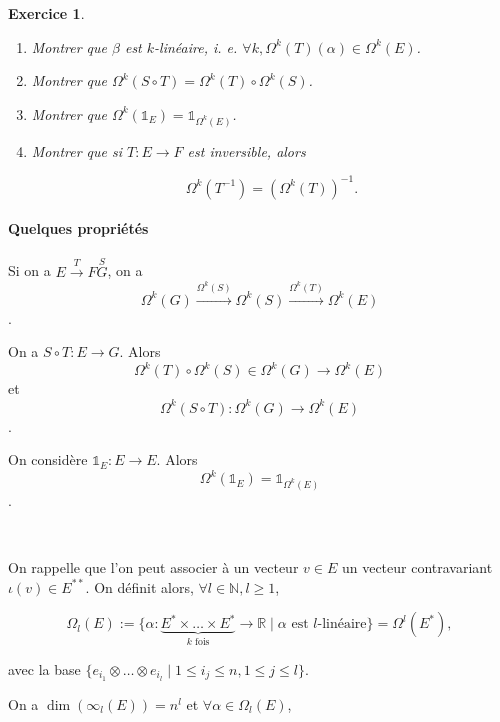 \documentclass[french]{article}
\newtheorem{exo}{Exercice}
\begin{document}
\begin{exo}

  \

  \begin{enumerate}
    \item Montrer que \(\beta\) est \(k\)-linéaire, i. e. \(\forall k , \Omega ^{k}(T)(\alpha) \in \Omega ^{k}(E)\).
    \item Montrer que \(\Omega ^{k}(S \circ T) = \Omega ^{k}(T) \circ \Omega ^{k}(S)\).
    \item Montrer que \(\Omega ^{k}(\mathds{1}_{E}) = \mathds{1}_{\Omega ^{k}(E)}\).
    \item Montrer que si \(T : E \to F\) est inversible, alors

    \[\Omega ^{k}(T ^{-1} ) = (\Omega ^{k}(T)) ^{-1}. \]
  \end{enumerate}
\end{exo}

\paragraph{Quelques propriétés}

Si on a \(E \stackrel{T}{\longrightarrow} F \stackrel{S}{G}\), on a \[\Omega ^{k}(G) \stackrel{\Omega ^{k}(S)}{\longrightarrow} \Omega ^{k}(S) \stackrel{\Omega ^{k}(T)}{\longrightarrow} \Omega ^{k}(E)\].

On a \(S \circ T : E \longrightarrow G\). Alors \[\Omega ^{k}(T) \circ \Omega ^{k}(S) \in \Omega ^{k}(G) \longrightarrow \Omega ^{k}(E)\] et \[\Omega ^{k}(S \circ T) : \Omega ^{k}(G) \longrightarrow \Omega ^{k}(E)\].

On considère \(\mathds{1}_{E} : E \to E\). Alors \[\Omega ^{k}(\mathds{1}_{E}) = \mathds{1}_{\Omega ^{k}(E)}\].

\

On rappelle que l'on peut associer à un vecteur \(v \in E\) un vecteur contravariant \( \iota(v) \in E ^{**}\). On définit alors, \(\forall l \in \mathbb{N}, l \geq  1\),

\[\Omega _{l}(E) := \{ \alpha : \underbrace{E ^{*} \times \dots \times E ^{*}}_{k \text{ fois} } \to \mathbb{R} \mid \alpha \text{ est } l\text{-linéaire}\} = \Omega ^{l}(E ^{*}), \]

avec la base \(\{ e _{i_1} \otimes \dots \otimes e _{i_l} \mid 1 \leq i_j \leq  n, 1 \leq j \leq l \}\).

On a \(\operatorname{dim}(\infty _{l}(E)) = n ^{l}\) et \( \forall \alpha \in \Omega _{l}(E)\),
\end{document}
